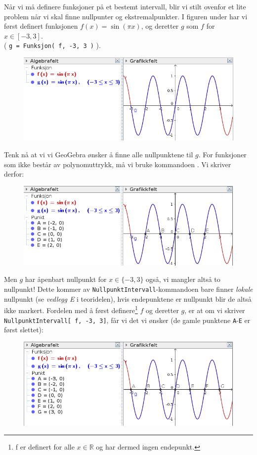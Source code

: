 Når vi må definere funksjoner på et bestemt intervall, blir vi stilt ovenfor et lite problem når vi skal finne nullpunter og ekstremalpunkter. I figuren under har vi først definert funksjonen $ f(x)=\sin(\pi x) $, og deretter $ g $ som $ f $ for $x \in[-3, 3] $.\\ ( \texttt{g = Funksjon( f, -3, 3 )} ).
\begin{figure}[H]
	\centering
	\includegraphics[scale=0.5]{fig/sin0}
\end{figure}
Tenk nå at vi vi GeoGebra ønsker å finne alle nullpunktene til $ g $. For funksjoner som ikke består av polynomuttrykk, må vi bruke kommandoen . Vi skriver derfor:
\begin{figure}[H]
	\centering
	\includegraphics[scale=0.5]{fig/sin}
\end{figure}
Men $ g $ har åpenbart nullpunkt for ${ x\in\lbrace-3, 3\rbrace }$ også, vi mangler altså to nullpunkt! Dette kommer av \texttt{NullpunktIntervall}-kommandoen bare finner \textit{lokale} nullpunkt (se \textsl{vedlegg E} i teoridelen), hvis endepunktene er nullpunkt blir de altså ikke markert.  Fordelen med å først definere\footnote{f er definert for alle $ x\in \mathbb{R} $ og har dermed ingen endepunkt.} $ f $ og deretter $ g $, er at om vi skriver \texttt{NullpunktIntervall[ f, -3, 3]}, får vi det vi ønsker (de gamle punktene \texttt{A}-\texttt{E} er først slettet):
\begin{figure}[H]
	\centering
	\includegraphics[scale=0.5]{fig/sin2}
\end{figure}

